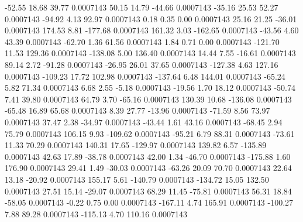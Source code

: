       -52.55       18.68       39.77     0.0007143
       50.15       14.79      -44.66     0.0007143
      -35.16       25.53       52.27     0.0007143
      -94.92        4.13       92.97     0.0007143
        0.18        0.35        0.00     0.0007143
       25.16       21.25      -36.01     0.0007143
      174.53        8.81     -177.68     0.0007143
      161.32        3.03     -162.65     0.0007143
      -43.56        4.60       43.39     0.0007143
      -62.70        1.36       61.56     0.0007143
        1.84        0.71        0.00     0.0007143
     -121.70       11.53      129.36     0.0007143
     -138.08        5.00      136.40     0.0007143
       14.44        7.55      -16.61     0.0007143
       89.14        2.72      -91.28     0.0007143
      -26.95       26.01       37.65     0.0007143
     -127.38        4.63      127.16     0.0007143
     -109.23       17.72      102.98     0.0007143
     -137.64        6.48      144.01     0.0007143
      -65.24        5.82       71.34     0.0007143
        6.68        2.55       -5.18     0.0007143
      -19.56        1.70       18.12     0.0007143
      -50.74        7.41       39.80     0.0007143
       64.79        3.70      -65.16     0.0007143
      130.39       10.68     -136.08     0.0007143
      -65.48       16.89       65.68     0.0007143
        8.39       27.77      -13.96     0.0007143
      -71.59        8.56       73.97     0.0007143
       37.47        2.38      -34.97     0.0007143
      -43.44        1.61       43.16     0.0007143
      -68.45        2.94       75.79     0.0007143
      106.15        9.93     -109.62     0.0007143
      -95.21        6.79       88.31     0.0007143
      -73.61       11.33       70.29     0.0007143
      140.31       17.65     -129.97     0.0007143
      139.82        6.57     -135.89     0.0007143
       42.63       17.89      -38.78     0.0007143
       42.00        1.34      -46.70     0.0007143
     -175.88        1.60      176.90     0.0007143
       29.41        1.49      -30.03     0.0007143
      -63.26       20.09       70.70     0.0007143
       22.64       13.18      -20.92     0.0007143
      155.17        5.61     -140.79     0.0007143
     -134.72       15.05      132.50     0.0007143
       27.51       15.14      -29.07     0.0007143
       68.29       11.45      -75.81     0.0007143
       56.31       18.84      -58.05     0.0007143
       -0.22        0.75        0.00     0.0007143
     -167.11        4.74      165.91     0.0007143
     -100.27        7.88       89.28     0.0007143
     -115.13        4.70      110.16     0.0007143

